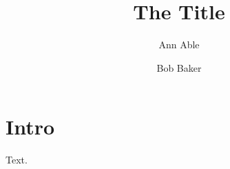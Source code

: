 \documentclass{colorart}
\begin{document}
\title{The Title}
\author{Ann Able}
\address{First University, Main Street 1, Town}
\author{Bob Baker}
\address{Second Institute, City}
\maketitle
\section{Intro}
Text.
\end{document}
